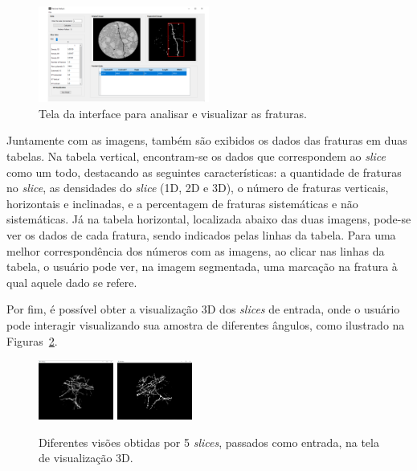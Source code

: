 \documentclass[a4paper,10pt,twocolumn,twoside]{article}
\begin{document}
\begin{figure}[!htb]
\centering
\includegraphics[width=0.5\textwidth]{Figuras/tela-fracture.pdf}
\caption{Tela da interface para analisar e visualizar as fraturas.}
\label{fig:TelaFratura}
\end{figure}

Juntamente com as imagens, também são exibidos os dados das fraturas em duas tabelas. Na tabela vertical, encontram-se os dados que correspondem ao \textit{slice} como um todo, destacando as seguintes características: a quantidade de fraturas no \textit{slice}, as densidades do \textit{slice} (1D, 2D e 3D), o número de fraturas verticais, horizontais e inclinadas, e a percentagem de fraturas sistemáticas e não sistemáticas. Já na tabela horizontal, localizada abaixo das duas imagens, pode-se ver os dados de cada fratura, sendo indicados pelas linhas da tabela. Para uma melhor correspondência dos números com as imagens, ao clicar nas linhas da tabela, o usuário pode ver, na imagem segmentada, uma marcação na fratura à qual aquele dado se refere.

Por fim, é possível obter a visualização 3D dos \textit{slices} de entrada, onde o usuário pode interagir visualizando sua amostra de diferentes ângulos, como ilustrado na Figuras~\ref{fig:tela3DFraturas}.


\begin{figure}[!htb]
\centering
\includegraphics[width=0.22\textwidth]{Figuras/F-3dview-1.png}
\includegraphics[width=0.22\textwidth]{Figuras/F-3dview-2.png}
\caption{Diferentes visões obtidas por 5 \textit{slices}, passados como entrada, na tela de visualização 3D.}
\label{fig:tela3DFraturas}
\end{figure}
\end{document}
